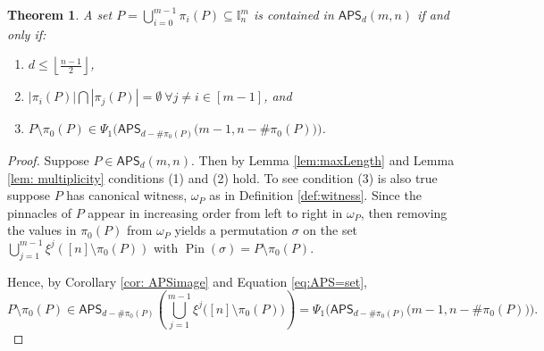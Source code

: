 \documentclass[12pt,reqno]{amsart}
\numberwithin{equation}{section}
\theoremstyle{plain}
\newtheorem{theorem}{Theorem}[section]
\theoremstyle{definition}
\theoremstyle{remark}
\newcommand{\I}{\mathbb{I}}
\newcommand{\Pin}{\operatorname{Pin}}
\newcommand\APS{\mathsf{APS}}
\newcommand{\floor}[1]{\left\lfloor#1\right\rfloor}
\begin{document}
\begin{theorem}\label{thm: pinCharacter}
    A set $P=\bigcup_{i=0}^{m-1}\pi_i(P) \subseteq \I_n^m$ is contained in $\APS_d(m,n)$ 
    if and only if:
    \begin{enumerate}
        \item $d\leq \floor{\frac{n-1}{2}}$,
        \item $|\pi_i(P)| \bigcap |\pi_j(P)| =  \emptyset  \ \forall j \neq i \in [m-1]$, and
    \item[(3)] $P\setminus \pi_0(P) \in \Psi_1\Big(\APS_{d-\#\pi_0(P)}\Big(m-1,n-\#\pi_0(P)\Big)\Big)$.
    \end{enumerate}
\end{theorem}
\begin{proof}
Suppose $P \in \APS_d(m,n)$. Then by Lemma \ref{lem:maxLength} and Lemma \ref{lem: multiplicity} conditions (1) and (2) hold. 
To see condition (3) is also true suppose $P$ has canonical witness, $\omega_P$ as in Definition \ref{def:witness}. Since the pinnacles of $P$ appear in increasing order from left to right in $\omega_P$, then removing the values in $\pi_0(P)$ from $\omega_P$ yields a permutation $\sigma$ on the set $\bigcup_{j=1}^{m-1} \xi^{j}([n]\setminus \pi_0(P))$ with $\Pin(\sigma)=P\setminus \pi_0(P)$.

Hence, by Corollary \ref{cor: APSimage} and Equation \ref{eq:APS=set},
\[P\setminus \pi_0(P) \in \APS_{d-\#\pi_0(P)}\left( \bigcup_{j=1}^{m-1} \xi^{j}\Big([n]\setminus \pi_0(P)\Big)\right)=\Psi_1\Big(\APS_{d-\#\pi_0(P)}\Big(m-1,n-\#\pi_0(P)\Big)\Big).\]


\end{proof}
\end{document}
